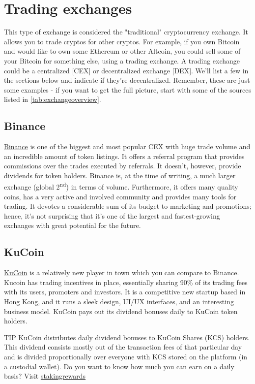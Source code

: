 \section{Trading exchanges}
\label{subsec:trading_exchange}

This type of exchange is considered the "traditional" cryptocurrency exchange. It allows you to trade cryptos for other cryptos. For example, if you own Bitcoin and would like to own some Ethereum or other Altcoin, you could sell some of your Bitcoin for something else, using a trading exchange. A trading exchange could be a centralized [CEX] or decentralized exchange [DEX]. We'll list a few in the sections below and indicate if they're decentralized. Remember, these are just some examples - if you want to get the full picture, start with some of the sources listed in \cref{tab:exchangeoverview}.

\subsection*{Binance} 
\href{https://www.binance.com/?ref=35602166}{Binance} is one of the biggest and most popular CEX with huge trade volume and an incredible amount of token listings. It offers a referral program that provides commissions over the trades executed by referrals. It doesn't, however, provide dividends for token holders. Binance is, at the time of writing, a much larger exchange (global 2\textsuperscript{nd}) in terms of volume.
Furthermore, it offers many quality coins, has a very active and involved community and provides many tools for trading. It devotes a considerable sum of its budget to marketing and promotions; hence, it's not surprising that it's one of the largest and fastest-growing exchanges with great potential for the future. 


\subsection*{KuCoin}
\href{https://www.kucoin.com/#/?r=aNuPeb}{KuCoin} is a relatively new player in town which you can compare to Binance. Kucoin has trading incentives in place, essentially sharing 90\% of its trading fees with its users, promoters and investors. It is a competitive new startup based in Hong Kong, and it runs a sleek design, UI/UX interfaces, and an interesting business model. KuCoin pays out its dividend bonuses daily to KuCoin token holders. 

    \bigskip
    \begin{topbox}{TIP}
    KuCoin distributes daily dividend bonuses to KuCoin Shares (KCS) holders. This dividend consists mostly out of the transaction fees of that particular day and is divided proportionally over everyone with KCS stored on the platform (in a custodial wallet).
    \tcblower
    Do you want to know how much you can earn on a daily basis? Visit \href{https://www.stakingrewards.com/asset/kucoin-shares}{stakingrewards}
    \end{topbox}
    
